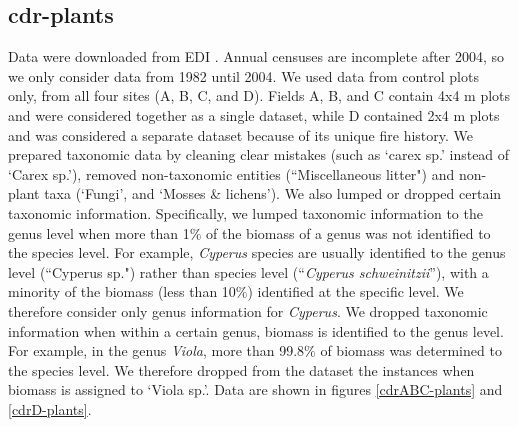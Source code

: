 \documentclass[11pt, oneside]{article}
\begin{document}
\subsection {cdr-plants}
Data were downloaded from EDI \citep{cdr-plants}.
Annual censuses are incomplete after 2004, so we only consider data from 1982 until 2004. 
We used data from control plots only, from all four sites (A, B, C, and D). 
Fields A, B, and C contain 4x4 m plots and were considered together as a single dataset, while D contained 2x4 m plots and was considered a separate dataset because of its unique fire history.
We prepared taxonomic data by cleaning clear mistakes (such as `carex sp.' instead of `Carex sp.'), removed non-taxonomic entities (``Miscellaneous litter") and non-plant taxa (`Fungi', and `Mosses \& lichens').
We also lumped or dropped certain taxonomic information. 
Specifically, we lumped taxonomic information to the genus level when more than 1$\%$ of the biomass of a genus was not identified to the species level. 
For example, {\it Cyperus} species are usually identified to the genus level (``Cyperus  sp.") rather than species level (``{\it Cyperus schweinitzii}''), with a minority of the biomass (less than 10$\%$) identified at the specific level. 
We therefore consider only genus information for {\it Cyperus}. 
We dropped taxonomic information when within a certain genus, biomass is identified to the genus level. 
For example, in the genus {\it Viola}, more than 99.8$\%$ of biomass was determined to the species level. We therefore dropped from the dataset the instances when biomass is assigned to `Viola sp.'.
Data are shown in figures \ref{cdrABC-plants} and \ref{cdrD-plants}.
\end{document}

